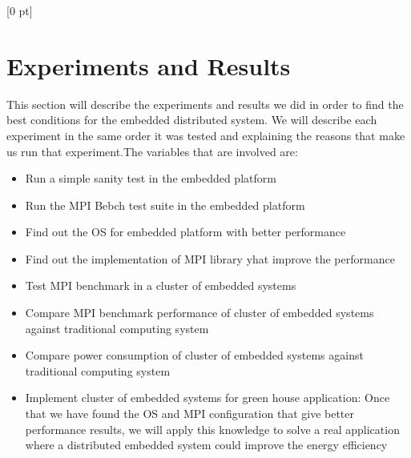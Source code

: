 \titlespacing{\chapter}{0 pt}{30 pt}{50 pt}[0 pt]
\titleformat{\section}{\Large\bfseries}{\thesection}{0 pt}{\hspace{30 pt}}
\titleformat{\subsection}{\large\bfseries}{\thesubsection}{0 pt}{\hspace{30 pt}}
\pagestyle{fancy}
\fancyhead[LO,LE]{\footnotesize\emph{\leftmark}}
\fancyhead[RO,RE]{\thepage}
\fancyfoot[CO,CE]{}

\chapter{Experiments and Results}

\normalsize
\noindent

This section will describe the experiments and results we did in order to find
the best conditions for the embedded distributed system. We will describe each
experiment in the same order it was tested and explaining the reasons that make
us run that experiment.The variables that are involved are: 

\begin{itemize}
\item Run a simple sanity test in the embedded platform
\item Run the MPI Bebch test suite in the embedded platform
\item Find out the OS for embedded platform with better performance 
\item Find out the implementation of MPI library yhat improve the performance
\item Test MPI benchmark in a cluster of embedded systems
\item Compare MPI benchmark performance of cluster of embedded systems
against traditional computing system
\item Compare power consumption of cluster of embedded systems against
traditional computing system
\item Implement cluster of embedded systems for green house application: Once
that we have found the OS and MPI configuration that give better performance
results, we will apply this knowledge to solve a real application where a
distributed embedded system could improve the energy efficiency
\end{itemize}

